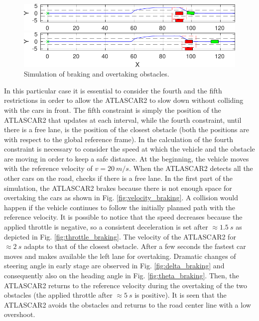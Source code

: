 \begin{figure}[!h]
\begin{minipage}[t]{\textwidth}
	\end{minipage}
	\begin{minipage}[t]{\textwidth}
		\includegraphics[width=\textwidth]{./figure/three_obstacles_no_overtaking/braking_5.pdf}
	\end{minipage}
	\begin{minipage}[t]{\textwidth}
		\includegraphics[width=\textwidth]{./figure/three_obstacles_no_overtaking/braking_6.pdf}
	\end{minipage}
	\caption{Simulation of braking and overtaking obstacles.}
	\label{fig:braking}
\end{figure}

In this particular case it is essential to consider the fourth and the fifth restrictions in order to allow the ATLASCAR2 to slow down without colliding with the cars in front. The fifth constraint is simply the position of the ATLASCAR2 that updates at each interval, while the fourth constraint, until there is a free lane, is the position of the closest obstacle (both the positions are with respect to the global reference frame). In the calculation of the fourth constraint is necessary  to consider the speed at which the vehicle and the obstacle are moving in order to keep a safe distance.
At the beginning, the vehicle moves with the reference velocity of $v=\SI{20}{m/s}$. When the ATLASCAR2 detects all the other cars on the road, checks if there is a free lane. In the first part of the simulation, the ATLASCAR2 brakes because there is not enough space for overtaking the cars as shown in Fig. \ref{fig:velocity_braking}. A collision would happen if the vehicle continues to follow the initially planned path with the reference velocity. It is possible to notice that the speed decreases because the applied throttle is negative, so a consistent deceleration is set after $\approx\SI{1.5}{s}$ as depicted in Fig. \ref{fig:throttle_braking}. The velocity of the ATLASCAR2 for $\approx\SI{2}{s}$ adapts to that of the closest obstacle. After a few seconds the fastest car moves and makes available the left lane for overtaking. Dramatic changes of steering angle in early stage are observed in Fig. \ref{fig:delta_braking} and consequently also on the heading angle in Fig. \ref{fig:theta_braking}. Then, the ATLASCAR2 returns to the reference velocity during the overtaking of the two obstacles (the applied throttle after $\approx\SI{5}{s}$ is positive). It is seen that the ATLASCAR2 avoids the obstacles and returns to the road center line with a low overshoot.

